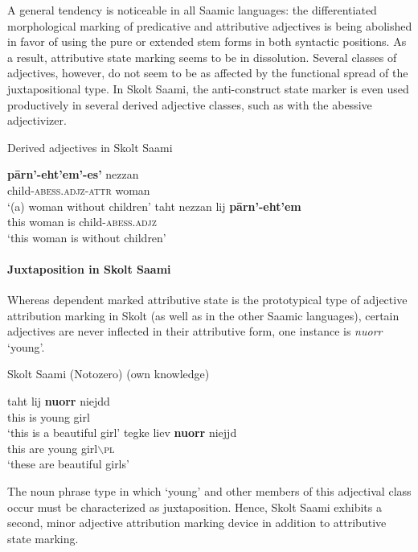 A general tendency is noticeable in all Saamic languages: the differentiated morphological marking of predicative and attributive adjectives is being abolished in favor of using the pure or extended stem forms in both syntactic positions. As a result, attributive state marking seems to be in dissolution. Several classes of adjectives, however, do not seem to be as affected by the functional spread of the juxtapositional type. In Skolt Saami, the anti-construct state marker is even used productively in several derived adjective classes, such as with the abessive adjectivizer.
\begin{exe}
\ex \rm{Derived adjectives in Skolt Saami \citep[279]{senkevic-g1968}}
\begin{xlist}
\ex
\gll	\textbf{pārn'-eht'em'-es'} nezzan\\
	child-\textsc{abess.adjz-attr} woman\\
\glt	‘(a) woman without children’
\ex
\gll 	taht nezzan lij \textbf{pārn'-eht'em}\\
	this woman is child-\textsc{abess.adjz}\\
\glt	‘this woman is without children’
\end{xlist}
\end{exe}

\paragraph{Juxtaposition in Skolt Saami}
Whereas dependent marked attributive state is the prototypical type of adjective attribution marking in Skolt (as well as in the other Saamic languages), certain adjectives are never inflected in their attributive form, one instance is \textit{nuorr} ‘young’.
\begin{exe}
\ex \rm{Skolt Saami (Notozero) (own knowledge)}
\begin{xlist}
\ex
\gll 	taht lij \textbf{nuorr} niejdd\\
	this is young girl\\
\glt	‘this is a beautiful girl’
\ex	
\gll	tegke liev \textbf{nuorr} niejjd\\
	this are young girl$\backslash$\textsc{pl}\\
\glt	‘these are beautiful girls’
\end{xlist}
\end{exe}
The noun phrase type in which ‘young’ and other members of this adjectival class occur must be characterized as {juxtaposition}. Hence, Skolt Saami exhibits a second, minor adjective attribution marking device in addition to attributive state marking.

